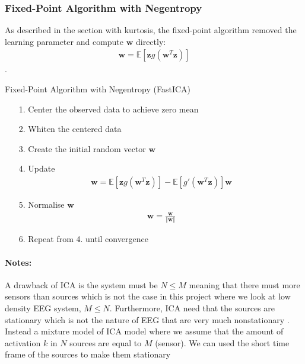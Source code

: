 \subsubsection*{Fixed-Point Algorithm with Negentropy}
As described in the section with kurtosis, the fixed-point algorithm removed the learning parameter and compute $\mathbf{w}$ directly:
\begin{align*}
\mathbf{w} = \mathbb{E}[\mathbf{z} g(\mathbf{w}^T \mathbf{z})]
\end{align*}
.
\begin{algorithm}[H]
\caption{Fixed-Point Algorithm with Negentropy (FastICA)}
\begin{itemize}
\item[1.] Center the observed data to achieve zero mean
\item[2.] Whiten the centered data
\item[3.] Create the initial random vector $\mathbf{w}$
\item[4.] Update
\begin{align*}
\mathbf{w} = \mathbb{E}[ \mathbf{z} g(\mathbf{w}^T \mathbf{z})] - \mathbb{E}[g'(\mathbf{w}^T \mathbf{z})] \mathbf{w}
\end{align*}
\item[5.] Normalise $\mathbf{w}$
\begin{align*}
\mathbf{w} = \frac{\mathbf{w}}{\Vert \mathbf{w} \Vert}
\end{align*}
\item[6.] Repeat from 4. until convergence
\end{itemize}
\end{algorithm}


\paragraph{Notes:}
A drawback of ICA is the system must be $N \leq M$ meaning that there must more sensors than sources which is not the case in this project where we look at low density EEG system, $M \leq N$. Furthermore, ICA need that the sources are stationary which is not the nature of EEG that are very much nonstationary \cite[p. 7-8]{PHD}.
\\
Instead a mixture model of ICA model where we assume that the amount of activation $k$ in $N$ sources are equal to $M$ (sensor). We can used the short time frame of the sources to make them stationary
